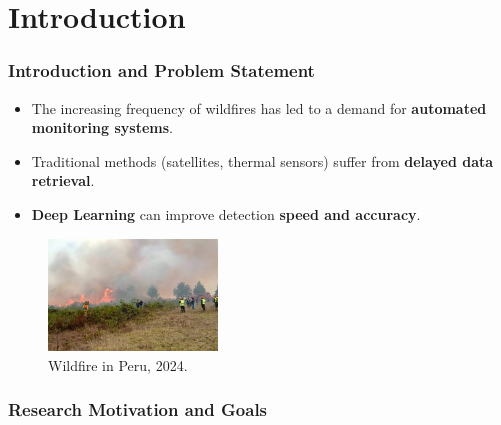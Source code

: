 \section{Introduction}
\label{sec:intro}

    \begin{frame}
    \frametitle{Introduction and Problem Statement}
    \begin{itemize}
        \item The increasing frequency of wildfires has led to a demand for \textbf{automated monitoring systems}.
        \item Traditional methods (satellites, thermal sensors) suffer from \textbf{delayed data retrieval}.
        \item \textbf{Deep Learning} can improve detection \textbf{speed and accuracy}.
    \end{itemize}

    \begin{figure}
        \centering
        \includegraphics[width=0.4\textwidth]{images/wildfire}
        \caption{Wildfire in Peru, 2024.}\label{fig:wildfire}
    \end{figure}
\end{frame}

\begin{frame}
    \frametitle{Research Motivation and Goals}
\end{frame}